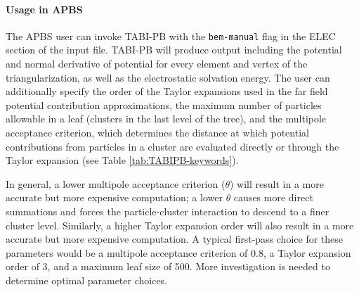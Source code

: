 \documentclass[journal=jpcbfk, manuscript=article]{achemso}
\begin{document}
\paragraph{Usage in APBS}
The APBS user can invoke TABI-PB with the \texttt{bem-manual} flag in the ELEC section of the input file. TABI-PB will produce output including the potential and normal derivative of potential for every element and vertex of the triangularization, as well as the electrostatic solvation energy. The user can additionally specify the order of the Taylor expansions used in the far field potential contribution approximations, the maximum number of particles allowable in a leaf (clusters in the last level of the tree), and the multipole acceptance criterion, which determines the distance at which potential contributions from particles in a cluster are evaluated directly or through the Taylor expansion (see Table \ref{tab:TABIPB-keywords}). 

In general, a lower multipole acceptance criterion ($\theta$) will result in a more accurate but more expensive computation; a lower $\theta$ causes more direct summations and forces the particle-cluster interaction to descend to a finer cluster level. Similarly, a higher Taylor expansion order will also result in a more accurate but more expensive computation. A typical first-pass choice for these parameters would be a multipole acceptance criterion of 0.8, a Taylor expansion order of 3, and a maximum leaf size of 500. More investigation is needed to determine optimal parameter choices.
\end{document}

